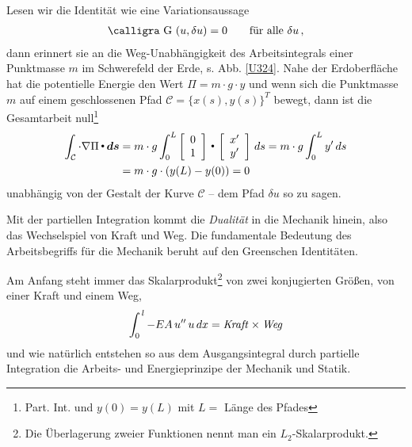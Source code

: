 {{{{Lesen wir die Identit\"{a}t wie eine Variationsaussage
\begin{align}
\text{\normalfont\calligra G\,\,}(u,\delta u) = 0 \qquad \text{f\"{u}r alle $\delta u$}\,,
\end{align}
dann erinnert sie an die Weg-Unabh\"{a}ngigkeit des Arbeitsintegrals einer Punktmasse $m$ im Schwerefeld der Erde, s. Abb. \ref{U324}. Nahe der Erdoberfl\"{a}che hat die potentielle Energie den Wert $\Pi = m\cdot g \cdot y$ und wenn sich die Punktmasse $m$ auf einem geschlossenen Pfad $\mathcal{ C} = \{x(s), y(s)\}^T$ bewegt, dann ist die Gesamtarbeit null\footnote{Part. Int. und $y(0) = y(L)$ mit $L = $ L\"{a}nge des Pfades}
\begin{align}
\int_{\mathcal{ C}} \cdot \nabla \Pi \dotprod  \vek d\vek s &= m \cdot g \int_{0}^L \left [\barr{c}  0 \\  1\earr \right ] \dotprod  \left [\barr{c}  x' \\  y'\earr \right ]\,ds =  m \cdot g \int_{0}^L  y'\,ds \nn \\
&= m \cdot g \cdot (y(L) - y(0)) = 0
\end{align}
unabh\"{a}ngig von der Gestalt der Kurve $\mathcal {C}$ -- dem Pfad $\delta u$ so zu sagen.

Mit der partiellen Integration kommt die {\em Dualit\"{a}t\/} in die Mechanik hinein, also das Wechselspiel von Kraft und Weg. Die fundamentale Bedeutung des Arbeitsbegriffs f\"{u}r die Mechanik beruht auf den Greenschen Identit\"{a}ten.

Am Anfang steht immer das Skalarprodukt\footnote{Die \"{U}berlagerung zweier Funktionen nennt man ein  $L_2$-Skalarprodukt.}  von zwei konjugierten Gr\"{o}{\ss}en, von einer Kraft und einem Weg,
\begin{align}
\int_0^{\,l}  - EA\,u''\,u\,dx = \text{{\em Kraft\/}} \times \text{{\em Weg\/}}
\end{align}
und wie nat\"{u}rlich entstehen so aus dem Ausgangsintegral durch partielle Integration die Arbeits- und Energieprinzipe der Mechanik und Statik.

}}}}
